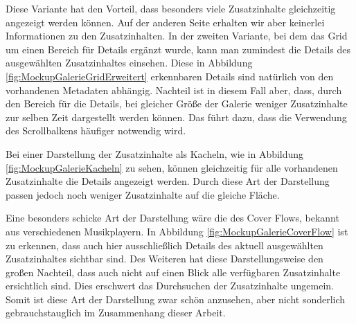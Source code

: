 
Diese Variante hat den Vorteil, dass besonders viele Zusatzinhalte gleichzeitig angezeigt werden können. Auf der anderen Seite erhalten wir aber keinerlei Informationen zu den Zusatzinhalten. In der zweiten Variante, bei dem das Grid um einen Bereich für Details ergänzt wurde, kann man zumindest die Details des ausgewählten Zusatzinhaltes einsehen. Diese in Abbildung \ref{fig:MockupGalerieGridErweitert} erkennbaren Details sind natürlich von den vorhandenen Metadaten abhängig. Nachteil ist in diesem Fall aber, dass, durch den Bereich für die Details, bei gleicher Größe der Galerie weniger Zusatzinhalte zur selben Zeit dargestellt werden können. Das führt dazu, dass die Verwendung des Scrollbalkens häufiger notwendig wird.


Bei einer Darstellung der Zusatzinhalte als Kacheln, wie in Abbildung \ref{fig:MockupGalerieKacheln} zu sehen, können gleichzeitig für alle vorhandenen Zusatzinhalte die Details angezeigt werden. Durch diese Art der Darstellung passen jedoch noch weniger Zusatzinhalte auf die gleiche Fläche.


Eine besonders schicke Art der Darstellung wäre die des Cover Flows, bekannt aus verschiedenen Musikplayern. In Abbildung \ref{fig:MockupGalerieCoverFlow} ist zu erkennen, dass auch hier ausschließlich Details des aktuell ausgewählten Zusatzinhaltes sichtbar sind. Des Weiteren hat diese Darstellungsweise den großen Nachteil, dass auch nicht auf einen Blick alle verfügbaren Zusatzinhalte ersichtlich sind. Dies erschwert das Durchsuchen der Zusatzinhalte ungemein. Somit ist diese Art der Darstellung zwar schön anzusehen, aber nicht sonderlich gebrauchstauglich im Zusammenhang dieser Arbeit.

